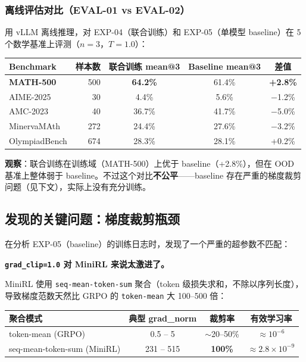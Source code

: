\documentclass[11pt,a4paper]{article}
\begin{document}
\subsubsection{离线评估对比（EVAL-01 vs EVAL-02）}

用 vLLM 离线推理，对 EXP-04（联合训练）和 EXP-05（单模型 baseline）在 5 个数学基准上评测（$n=3$，$T=1.0$）：

\begin{table}[h]
\centering
\begin{tabular}{lrccc}
\toprule
\textbf{Benchmark} & \textbf{样本数} & \textbf{联合训练 mean@3} & \textbf{Baseline mean@3} & \textbf{差值} \\
\midrule
\textbf{MATH-500} & 500 & \textbf{64.2\%} & 61.4\% & \textbf{+2.8\%} \\
AIME-2025 & 30 & 4.4\% & 5.6\% & $-$1.2\% \\
AMC-2023 & 40 & 36.7\% & 41.7\% & $-$5.0\% \\
MinervaMAth & 272 & 24.4\% & 27.6\% & $-$3.2\% \\
OlympiadBench & 674 & 28.3\% & 28.1\% & +0.2\% \\
\bottomrule
\end{tabular}
\end{table}

\textbf{观察}：联合训练在训练域（MATH-500）上优于 baseline（+2.8\%），但在 OOD 基准上整体弱于 baseline。不过这个对比\textbf{不公平}——baseline 存在严重的梯度裁剪问题（见下文），实际上没有充分训练。

\subsection{发现的关键问题：梯度裁剪瓶颈}

在分析 EXP-05（baseline）的训练日志时，发现了一个严重的超参数不匹配：

\textbf{\texttt{grad\_clip=1.0} 对 MiniRL 来说太激进了。}

MiniRL 使用 \texttt{seq-mean-token-sum} 聚合（token 级损失求和，不除以序列长度），导致梯度范数天然比 GRPO 的 \texttt{token-mean} 大 100--500 倍：

\begin{table}[h]
\centering
\begin{tabular}{lccc}
\toprule
\textbf{聚合模式} & \textbf{典型 grad\_norm} & \textbf{裁剪率} & \textbf{有效学习率} \\
\midrule
token-mean (GRPO) & 0.5 -- 5 & $\sim$20--50\% & $\approx 10^{-6}$ \\
seq-mean-token-sum (MiniRL) & 231 -- 515 & \textbf{100\%} & $\approx 2.8 \times 10^{-9}$ \\
\bottomrule
\end{tabular}
\end{table}
\end{document}

